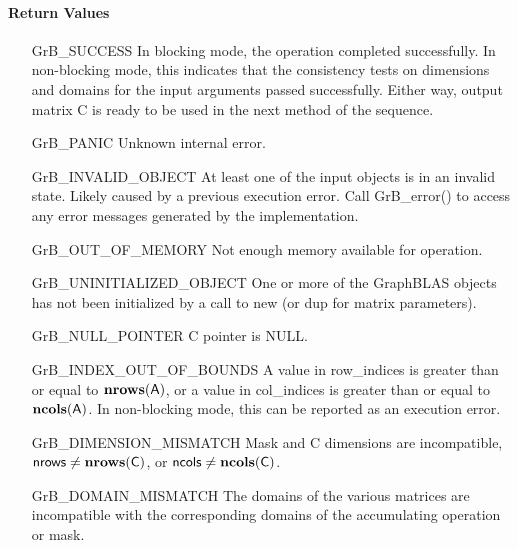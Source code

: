 \paragraph{Return Values}

\begin{itemize}[leftmargin=2.1in]
    \item[{\sf GrB\_SUCCESS}]         In blocking mode, the operation completed
    successfully. In non-blocking mode, this indicates that the consistency 
    tests on dimensions and domains for the input arguments passed successfully. 
    Either way, output matrix {\sf C} is ready to be used in the next method of 
    the sequence.

    \item[{\sf GrB\_PANIC}]            Unknown internal error.
    
    \item[{\sf GrB\_INVALID\_OBJECT}] At least one of the input objects is in an invalid state.
	    Likely caused by a previous execution error.
    Call {GrB\_error()} to access 
    any error messages generated by the implementation.

    \item[{\sf GrB\_OUT\_OF\_MEMORY}]  Not enough memory available for operation.
    
    \item[{\sf GrB\_UNINITIALIZED\_OBJECT}] One or more of the GraphBLAS objects 
    has not been initialized by a call to {\sf new} (or {\sf dup} for matrix
    parameters).

    \item[{\sf GrB\_NULL\_POINTER}]  {\sf C} pointer is {\sf NULL}. 

    \item[{\sf GrB\_INDEX\_OUT\_OF\_BOUNDS}]  A value in {\sf row\_indices} 
    is greater than or equal to $\bold{nrows}({\sf A})$, or a value in 
    {\sf col\_indices} is greater than or equal to $\bold{ncols}({\sf A})$.  In 
    non-blocking mode, this can be reported as an execution error.
    
    \item[{\sf GrB\_DIMENSION\_MISMATCH}] {\sf Mask} and {\sf C} dimensions are
    incompatible, ${\sf nrows} \neq \bold{nrows}({\sf C})$, or 
    ${\sf ncols} \neq \bold{ncols}({\sf C})$.

    \item[{\sf GrB\_DOMAIN\_MISMATCH}]     The domains of the various matrices
    are incompatible with the corresponding domains of the accumulating 
    operation or mask.
\end{itemize}

